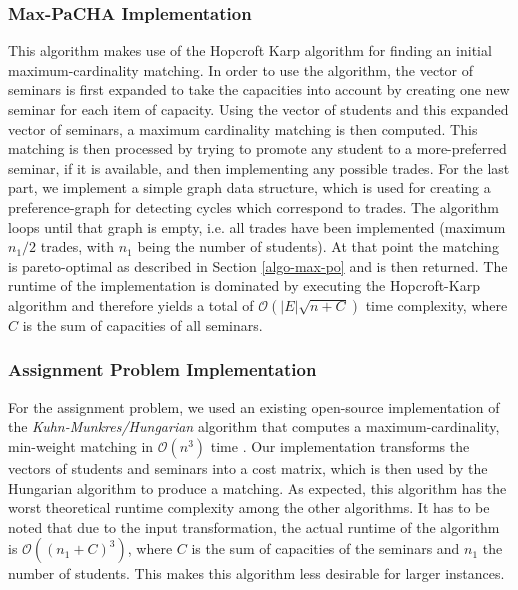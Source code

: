 \subsubsection{Max-PaCHA Implementation}\label{impl:maxpo}
This algorithm makes use of the Hopcroft Karp algorithm for finding an initial maximum-cardinality matching. In order to use the algorithm, the vector of seminars is first expanded to take the capacities into account by creating one new seminar for each item of capacity. Using the vector of students and this expanded vector of seminars, a maximum cardinality matching is then computed. This matching is then processed by trying to promote any student to a more-preferred seminar, if it is available, and then implementing any possible trades. For the last part, we implement a simple graph data structure, which is used for creating a preference-graph for detecting cycles which correspond to trades. The algorithm loops until that graph is empty, i.e. all trades have been implemented (maximum $n_1/2$ trades, with $n_1$ being the number of students). At that point the matching is pareto-optimal as described in Section \ref{algo-max-po} and is then returned. The runtime of the implementation is dominated by executing the Hopcroft-Karp algorithm and therefore yields a total of $\mathcal{O}(|E|\sqrt{n+C})$ time complexity, where $C$ is the sum of capacities of all seminars.

\subsubsection{Assignment Problem Implementation}
For the assignment problem, we used an existing open-source implementation of the \emph{Kuhn-Munkres/Hungarian} algorithm that computes a maximum-cardinality, min-weight matching in $\mathcal{O}(n^3)$ time \cite{HungarianGithub}. Our implementation transforms the vectors of students and seminars into a cost matrix, which is then used by the Hungarian algorithm to produce a matching. As expected, this algorithm has the worst theoretical runtime complexity among the other algorithms. It has to be noted that due to the input transformation, the actual runtime of the algorithm is $\mathcal{O}((n_1 + C)^3)$, where $C$ is the sum of capacities of the seminars and $n_1$ the number of students. This makes this algorithm less desirable for larger instances.

